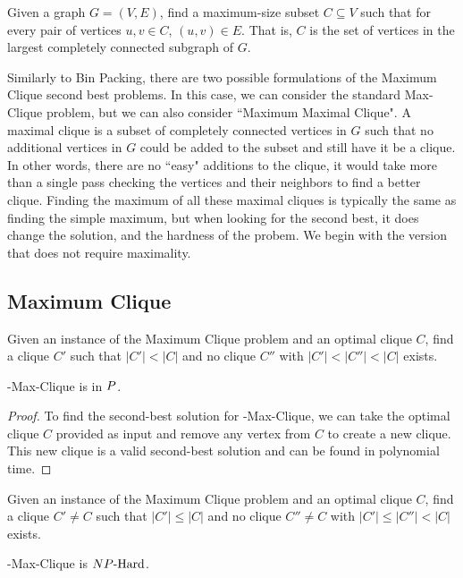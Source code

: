 \begin{definition}
Given a graph $G = (V, E)$, find a maximum-size subset $C \subseteq V$ such that for every pair of vertices $u, v \in C$, $(u, v) \in E$. That is, $C$ is the set of vertices in the largest completely connected subgraph of $G$. 
\end{definition}
Similarly to Bin Packing, there are two possible formulations of the Maximum Clique second best problems. In this case, we can consider the standard Max-Clique problem, but we can also consider ``Maximum Maximal Clique". A maximal clique is a subset of completely connected vertices in $G$ such that no additional vertices in $G$ could be added to the subset and still have it be a clique. In other words, there are no ``easy" additions to the clique, it would take more than a single pass checking the vertices and their neighbors to find a better clique. Finding the maximum of all these maximal cliques is typically the same as finding the simple maximum, but when looking for the second best, it does change the solution, and the hardness of the probem. We begin with the version that does not require maximality.
\subsection{Maximum Clique}
\begin{definition}
Given an instance of the Maximum Clique problem and an optimal clique $C$, find a clique $C'$ such that $|C'| < |C|$ and no clique $C''$ with $|C'| < |C''| < |C|$ exists.
\end{definition}

\begin{theorem}
\exob{}-Max-Clique is in ${P}{}$.
\end{theorem}
\begin{proof}
To find the second-best solution for \exob{}-Max-Clique, we can take the optimal clique $C$ provided as input and remove any vertex from $C$ to create a new clique. This new clique is a valid second-best solution and can be found in polynomial time.
\end{proof}

\begin{definition}
Given an instance of the Maximum Clique problem and an optimal clique $C$, find a clique $C' \neq C$ such that $|C'| \leq |C|$ and no clique $C'' \neq C$ with $|C'| \leq |C''| < |C|$ exists.
\end{definition}
\begin{theorem}
\inob{}-Max-Clique is ${NP\text{-Hard{}}}$.
\end{theorem}

